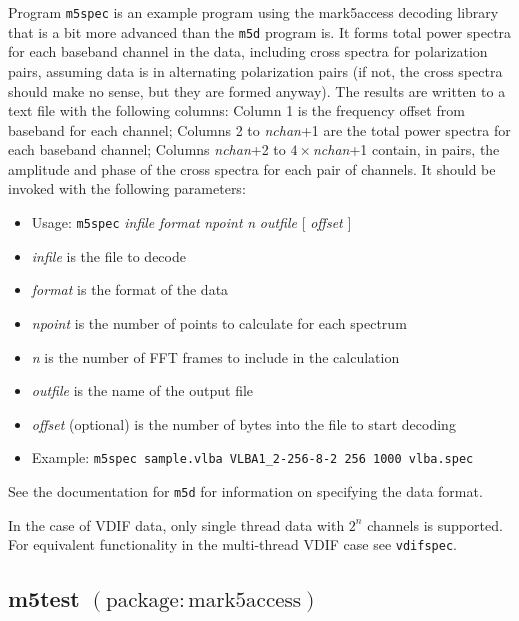 Program {\tt m5spec} is an example program using the mark5access decoding library that is a bit more advanced than the {\tt m5d} program is.
It forms total power spectra for each baseband channel in the data, including cross spectra for polarization pairs, assuming data is in alternating polarization pairs (if not, the cross spectra should make no sense, but they are formed anyway).
The results are written to a text file with the following columns: Column 1 is the frequency offset from baseband for each channel; Columns 2 to {\em nchan}+1 are the total power spectra for each baseband channel; Columns {\em nchan}+2 to $4 \times${\em nchan}+1 contain, in pairs, the amplitude and phase of the cross spectra for each pair of channels.
It should be invoked with the following parameters:

\begin{itemize}
\item[] Usage: {\tt m5spec} {\em infile} {\em format} {\em npoint} {\em n} {\em outfile} $[$ {\em offset} $]$ 
\item[] {\em infile} is the file to decode
\item[] {\em format} is the format of the data
\item[] {\em npoint} is the number of points to calculate for each spectrum
\item[] {\em n} is the number of FFT frames to include in the calculation
\item[] {\em outfile} is the name of the output file
\item[] {\em offset} (optional) is the number of bytes into the file to start decoding
\item[] Example: {\tt m5spec sample.vlba VLBA1\_2-256-8-2 256 1000 vlba.spec}
\end{itemize}

See the documentation for {\tt m5d} for information on specifying the data format.

In the case of VDIF data, only single thread data with $2^n$ channels is supported.
For equivalent functionality in the multi-thread VDIF case see {\tt vdifspec}.






\subsection{m5test {\small $\mathrm{(package: mark5access)}$}} \label{sec:m5test}

